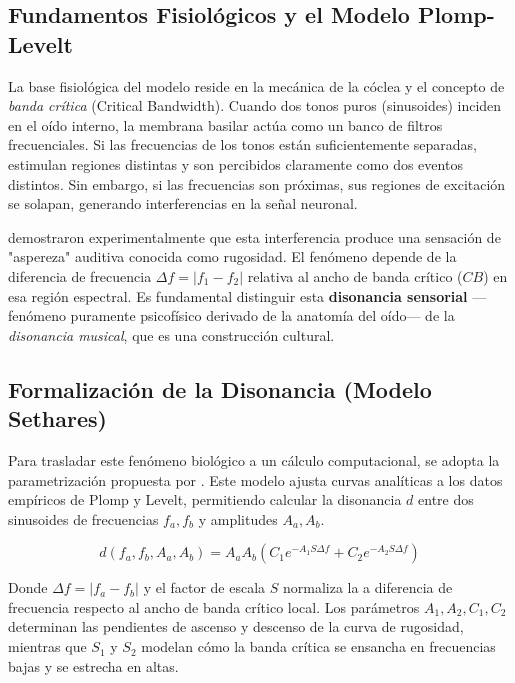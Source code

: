 \subsection{Fundamentos Fisiológicos y el Modelo Plomp-Levelt}

La base fisiológica del modelo reside en la mecánica de la cóclea y el concepto de \textit{banda crítica} (Critical Bandwidth). Cuando dos tonos puros (sinusoides) inciden en el oído interno, la membrana basilar actúa como un banco de filtros frecuenciales. Si las frecuencias de los tonos están suficientemente separadas, estimulan regiones distintas y son percibidos claramente como dos eventos distintos. Sin embargo, si las frecuencias son próximas, sus regiones de excitación se solapan, generando interferencias en la señal neuronal.

 demostraron experimentalmente que esta interferencia produce una sensación de "aspereza" auditiva conocida como rugosidad. El fenómeno depende de la diferencia de frecuencia $\Delta f = |f_1 - f_2|$ relativa al ancho de banda crítico ($CB$) en esa región espectral. Es fundamental distinguir esta \textbf{disonancia sensorial} ---fenómeno puramente psicofísico derivado de la anatomía del oído--- de la \textit{disonancia musical}, que es una construcción cultural.

\subsection{Formalización de la Disonancia (Modelo Sethares)}

Para trasladar este fenómeno biológico a un cálculo computacional, se adopta la parametrización propuesta por \cite{setharesLocalConsonanceRelationship1993}. Este modelo ajusta curvas analíticas a los datos empíricos de Plomp y Levelt, permitiendo calcular la disonancia $d$ entre dos sinusoides de frecuencias $f_a, f_b$ y amplitudes $A_a, A_b$.

\begin{equation}
\label{eq:sethares_pair}
d(f_a, f_b, A_a, A_b) = A_a A_b \left( C_1 e^{-A_1 S \Delta f} + C_2 e^{-A_2 S \Delta f} \right)
\end{equation}

Donde $\Delta f = |f_a - f_b|$ y el factor de escala $S$ normaliza la a diferencia de frecuencia respecto al ancho de banda crítico local. Los parámetros $A_1, A_2, C_1, C_2$ determinan las pendientes de ascenso y descenso de la curva de rugosidad, mientras que $S_1$ y $S_2$ modelan cómo la banda crítica se ensancha en frecuencias bajas y se estrecha en altas.

